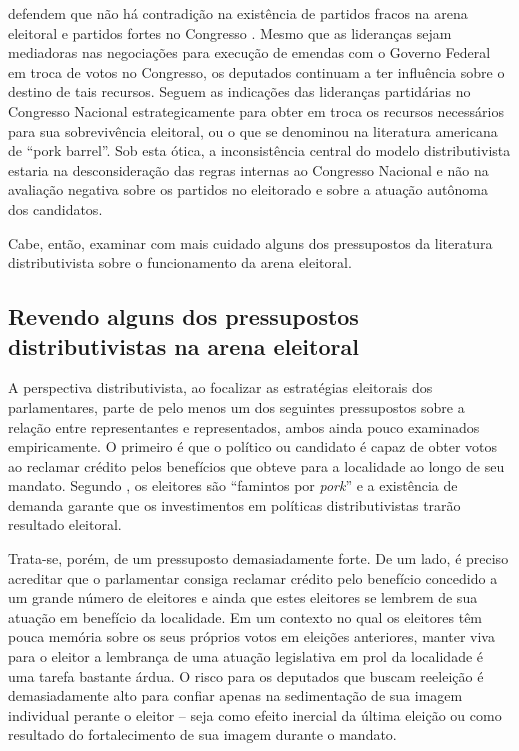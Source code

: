 \citeauthor{Pereira2003} defendem que não há contradição na existência de partidos fracos na arena eleitoral e partidos fortes no Congresso \citep{Pereira2002,Pereira2003}. Mesmo que as lideranças sejam mediadoras nas negociações para execução de emendas com o Governo Federal em troca de votos no Congresso, os deputados continuam a ter influência sobre o destino de tais recursos. Seguem as indicações das lideranças partidárias no Congresso Nacional estrategicamente para obter em troca os recursos necessários para sua sobrevivência eleitoral, ou  o que se denominou na literatura americana de ``pork barrel''. Sob esta ótica, a inconsistência central do modelo distributivista estaria na desconsideração das regras internas ao Congresso Nacional e não na avaliação negativa sobre os partidos no eleitorado e sobre a atuação autônoma dos candidatos.

Cabe, então, examinar com mais cuidado alguns dos pressupostos da literatura distributivista sobre o funcionamento da arena eleitoral.

\subsection{Revendo alguns dos pressupostos distributivistas na arena eleitoral}

A perspectiva distributivista, ao focalizar as estratégias eleitorais dos parlamentares, parte de pelo menos um dos seguintes pressupostos sobre a relação entre representantes e representados, ambos ainda pouco examinados empiricamente. O primeiro é que o político ou candidato é capaz de obter votos ao reclamar crédito pelos benefícios que obteve para a localidade ao longo de seu mandato. Segundo \citet*{Ames2011}, os eleitores são ``famintos por \emph{pork}'' e a existência de demanda garante que os investimentos em políticas distributivistas trarão resultado eleitoral.

Trata-se, porém, de um pressuposto demasiadamente forte. De um lado, é preciso acreditar que o parlamentar consiga reclamar crédito pelo benefício concedido a um grande número de eleitores e ainda que estes eleitores se lembrem de sua atuação em benefício da localidade. Em um contexto no qual os eleitores têm pouca memória sobre os seus próprios votos em eleições anteriores, manter viva para o eleitor a lembrança de uma atuação legislativa em prol da localidade é uma tarefa bastante árdua. O risco para os deputados que buscam reeleição é demasiadamente alto para confiar apenas na sedimentação de sua imagem individual perante o eleitor -- seja como efeito inercial da última eleição ou como resultado do fortalecimento de sua imagem durante o mandato.

